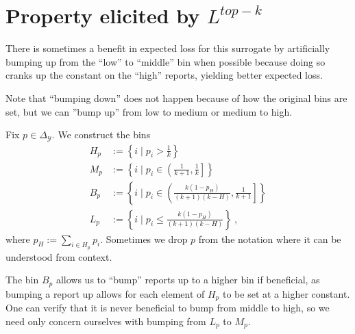 \documentclass[12pt]{article}
\newcommand{\Comments}{1}
\newcommand{\mynote}[2]{\ifnum\Comments=1\textcolor{#1}{#2}\fi}
\newcommand{\jessie}[1]{\mynote{purple}{[JF: #1]}}
\newcommand{\reals}{\mathbb{R}}
\newcommand{\simplex}{\Delta_\Y}
\newcommand{\U}{\mathcal{U}}
\newcommand{\Y}{\mathcal{Y}}
\newtheorem{proposition}{Proposition}
\begin{document}


\section{Property elicited by $L^{top-k}$}
There is sometimes a benefit in expected loss for this surrogate by artificially bumping up from the ``low'' to ``middle'' bin when possible because doing so cranks up the constant on the ``high'' reports, yielding better expected loss.

Note that ``bumping down'' does not happen because of how the original bins are set, but we can ''bump up'' from low to medium or medium to high.

Fix $p \in \simplex$.
We construct the bins
\begin{align*}
H_p &:= \left\{i \mid p_i > \frac 1 k\right\}\\
M_p &:= \left\{i \mid p_i \in \left(\frac 1 {k+1}, \frac 1 k\right]\right\} \\
B_p &:= \left\{i \mid p_i \in \left(\frac {k(1-p_H)}{(k+1)(k-H)}, \frac 1 {k+1} \right]\right\}\\
L_p &:= \left\{i \mid p_i \leq \frac {k(1-p_H)}{(k+1)(k-H)} \right\}~,~
\end{align*}
where $p_H := \sum_{i \in H_p} p_i$.
Sometimes we drop $p$ from the notation where it can be understood from context.


The bin $B_p$ allows us to ``bump'' reports up to a higher bin if beneficial, as bumping a report up allows for each element of $H_p$ to be set at a higher constant.
One can verify that it is never beneficial to bump from middle to high, so we need only concern ourselves with bumping from $L_p$ to $M_p$.
\end{document}
